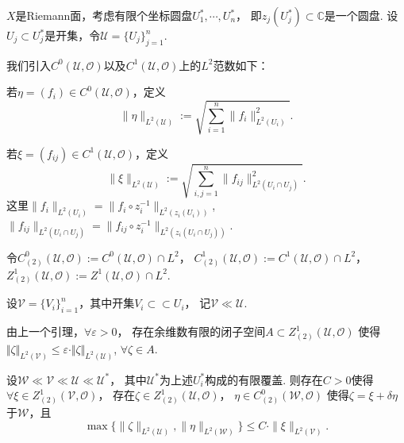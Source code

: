 \begin{definition}
	$X$是Riemann面，考虑有限个坐标圆盘$U_1^*, \cdots, U_n^*$，
    即$z_j(U_j^*)\subset \mathbb{C}$是一个圆盘. 
    设$U_j\subset U_j^*$是开集，令$\mathscr{U}=\{U_j\}_{j=1}^n$.

	我们引入$C^0(\mathscr{U},\mathcal{O})$以及$C^1(\mathscr{U},\mathcal{O})$上的$L^2$范数如下：\par
	若$\eta=(f_i)\in C^0(\mathscr{U},\mathcal{O})$，定义
	$$\|\eta\|_{L^2(\mathscr{U})}:=\sqrt{\sum_{i=1}^n \|f_i\|^2_{L^2(U_i)}}.$$
		
	若$\xi=(f_{ij})\in C^1(\mathscr{U},\mathcal{O})$，定义
	$$\|\xi\|_{L^2(\mathscr{U})}:=\sqrt{\sum_{i,j=1}^n \|f_{ij}\|^2_{L^2(U_i\cap U_j)}}.$$
	这里$\|f_i\|_{L^2(U_i)}=\|f_i\circ z_i^{-1}\|_{L^2(z_i(U_i))}$, 
    $\|f_{ij}\|_{L^2(U_i\cap U_j)}=\|f_{ij}\circ z_i^{-1}\|_{L^2(z_i(U_i\cap U_j))}$.
		
	令$C^0_{(2)}(\mathscr{U},\mathcal{O}):=C^0(\mathscr{U},\mathcal{O})\cap L^2$，
    $C^1_{(2)}(\mathscr{U},\mathcal{O}):=C^1(\mathscr{U},\mathcal{O})\cap L^2$，
    $Z^1_{(2)}(\mathscr{U},\mathcal{O}):=Z^1(\mathscr{U},\mathcal{O})\cap L^2$.

	设$\mathscr{V}=\{V_i\}_{i=1}^n$，其中开集$V_i\subset \subset U_i$，
    记$\mathscr{V}\ll\mathscr{U}$.

	由上一个引理，$\forall \varepsilon>0$，
    存在余维数有限的闭子空间$A\subset Z^1_{(2)}(\mathscr{U},\mathcal{O})$
    使得$\Vert \zeta\Vert_{L^2(\mathscr{V})} 
    \leq \varepsilon \cdot \Vert \zeta\Vert_{L^2(\mathscr{U})}$, $\forall \zeta\in A$.
\end{definition}
		
\begin{lemma}
	设$\mathscr{W}\ll\mathscr{V}\ll\mathscr{U}\ll\mathscr{U}^*$，
    其中$\mathscr{U}^*$为上述$U_i^*$构成的有限覆盖. 则存在$C>0$使得$\forall \xi\in Z^1_{(2)}(\mathscr{V}, \mathcal{O})$，
    存在$\zeta\in Z^1_{(2)}(\mathscr{U},\mathcal{O})$，
    $\eta\in C^0_{(2)}(\mathscr{W},\mathcal{O})$
    使得$\zeta=\xi+\delta \eta$于$\mathscr{W}$，且
	$$\max\{\|\zeta\|_{L^2(\mathscr{U})},\|\eta\|_{L^2(\mathscr{W})}\} 
    \leq C\cdot \|\xi\|_{L^2(\mathscr{V})}.$$
\end{lemma}
		
